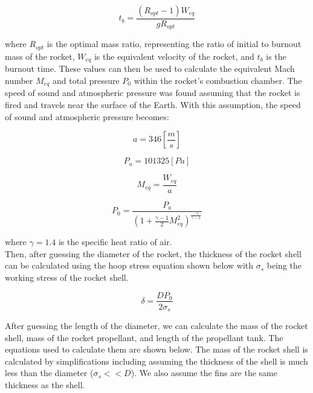 \documentclass{report}
\begin{document}
\begin{equation}
    t_b = \frac{(R_{opt}-1)W_{eq}}{gR_{opt}}
\end{equation}

\noindent where $R_{opt}$ is the optimal mass ratio, representing the ratio of initial to burnout mass of the rocket, $W_{eq}$ is the equivalent velocity of the rocket, and $t_b$ is the burnout time.
These values can then be used to calculate the equivalent Mach number $M_{eq}$ and total pressure $P_0$ within the rocket's combustion chamber.
The speed of sound and atmospheric pressure was found assuming that the rocket is fired and travels near the surface of the Earth. 
With this assumption, the speed of sound and atmospheric pressure becomes: 

\begin{equation}
    a = 346 [\frac{m}{s}]
\end{equation}

\begin{equation}
    P_a = 101325 [Pa]
\end{equation}

\begin{equation}
    M_{eq} = \frac{W_{eq}}{a}
\end{equation}

\begin{equation}
    P_0 = \frac{P_a}{(1+\frac{\gamma-1}{2}M^2_{eq})^{\frac{-\gamma}{\gamma-1}}}
\end{equation}

\noindent where $\gamma = 1.4$ is the specific heat ratio of air.\\

\noindent Then, after guessing the diameter of the rocket, the thickness of the rocket shell can be calculated using the hoop stress equation shown below with $\sigma_s$ being the working stress of the rocket shell.

\begin{equation}
    \delta = \frac{DP_0}{2\sigma_s}
\end{equation}

\noindent After guessing the length of the diameter, we can calculate the mass of the rocket shell, mass of the rocket propellant, and length of the propellant tank.
The equations used to calculate them are shown below.
The mass of the rocket shell is calculated by simplifications including assuming the thickness of the shell is much less than the diameter ($\sigma_s << D$).
We also assume the fins are the same thickness as the shell.
\end{document}
